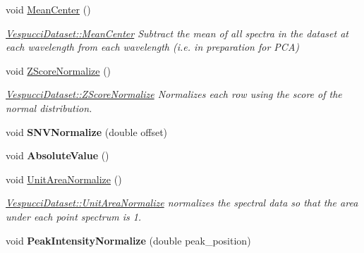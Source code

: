 \begin{DoxyCompactItemize}
\item 
\hypertarget{class_vespucci_dataset_af60babe573316c3e65fe1efa5be88964}{void \hyperlink{class_vespucci_dataset_af60babe573316c3e65fe1efa5be88964}{Mean\+Center} ()}\label{class_vespucci_dataset_af60babe573316c3e65fe1efa5be88964}

\begin{DoxyCompactList}\small\item\em \hyperlink{class_vespucci_dataset_af60babe573316c3e65fe1efa5be88964}{Vespucci\+Dataset\+::\+Mean\+Center} Subtract the mean of all spectra in the dataset at each wavelength from each wavelength (i.\+e. in preparation for P\+C\+A) \end{DoxyCompactList}\item 
\hypertarget{class_vespucci_dataset_ab2569b51fd98135d25f349438d95ae37}{void \hyperlink{class_vespucci_dataset_ab2569b51fd98135d25f349438d95ae37}{Z\+Score\+Normalize} ()}\label{class_vespucci_dataset_ab2569b51fd98135d25f349438d95ae37}

\begin{DoxyCompactList}\small\item\em \hyperlink{class_vespucci_dataset_ab2569b51fd98135d25f349438d95ae37}{Vespucci\+Dataset\+::\+Z\+Score\+Normalize} Normalizes each row using the score of the normal distribution. \end{DoxyCompactList}\item 
\hypertarget{class_vespucci_dataset_a25a12dfa77ac68d7e6980c7010dfe31c}{void {\bfseries S\+N\+V\+Normalize} (double offset)}\label{class_vespucci_dataset_a25a12dfa77ac68d7e6980c7010dfe31c}

\item 
\hypertarget{class_vespucci_dataset_a7d792a061bb5f20c71b25630f472b45d}{void {\bfseries Absolute\+Value} ()}\label{class_vespucci_dataset_a7d792a061bb5f20c71b25630f472b45d}

\item 
\hypertarget{class_vespucci_dataset_abcd2b804a6995abfb2d2fcb7e8380e80}{void \hyperlink{class_vespucci_dataset_abcd2b804a6995abfb2d2fcb7e8380e80}{Unit\+Area\+Normalize} ()}\label{class_vespucci_dataset_abcd2b804a6995abfb2d2fcb7e8380e80}

\begin{DoxyCompactList}\small\item\em \hyperlink{class_vespucci_dataset_abcd2b804a6995abfb2d2fcb7e8380e80}{Vespucci\+Dataset\+::\+Unit\+Area\+Normalize} normalizes the spectral data so that the area under each point spectrum is 1. \end{DoxyCompactList}\item 
\hypertarget{class_vespucci_dataset_a6c999f6492662781ea7ee26e4c38e574}{void {\bfseries Peak\+Intensity\+Normalize} (double peak\+\_\+position)}\label{class_vespucci_dataset_a6c999f6492662781ea7ee26e4c38e574}


\end{DoxyCompactItemize}

